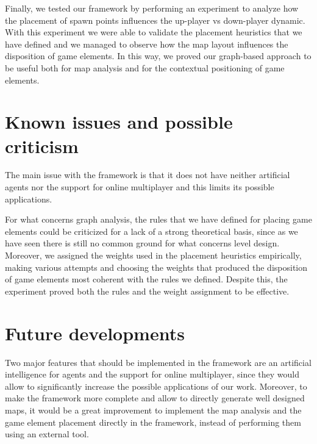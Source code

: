 \par

Finally, we tested our framework by performing an experiment to analyze how the placement of spawn points influences the up-player vs down-player dynamic. With this experiment we were able to validate the placement heuristics that we have defined and we managed to observe how the map layout influences the disposition of game elements. In this way, we proved our graph-based approach to be useful both for map analysis and for the contextual positioning of game elements.


\section{Known issues and possible criticism}

The main issue with the framework is that it does not have neither artificial agents nor the support for online multiplayer and this limits its possible applications.

\par

For what concerns graph analysis, the rules that we have defined for placing game elements could be criticized for a lack of a strong theoretical basis, since as we have seen there is still no common ground for what concerns level design. Moreover, we assigned the weights used in the placement heuristics empirically, making various attempts and choosing the weights that produced the disposition of game elements most coherent with the rules we defined. Despite this, the experiment proved both the rules and the weight assignment to be effective.


\section{Future developments}

Two major features that should be implemented in the framework are an artificial intelligence for agents and the support for online multiplayer, since they would allow to significantly increase the possible applications of our work. Moreover, to make the framework more complete and allow to directly generate well designed maps, it would be a great improvement to implement the map analysis and the game element placement directly in the framework, instead of performing them using an external tool.

